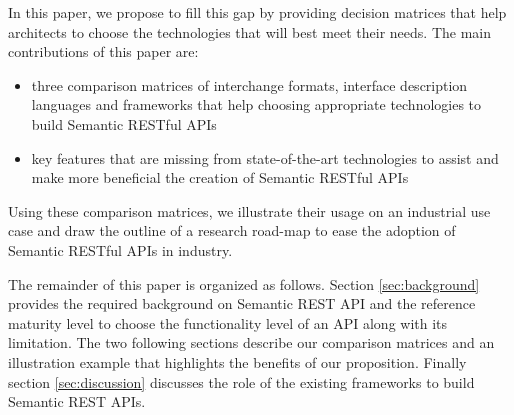  
 
In this paper, we propose to fill this gap by providing decision matrices that help architects to choose the technologies that will best meet their needs. The main contributions of this paper are:

\begin{itemize}
    \item three comparison matrices of interchange formats, interface description languages and frameworks that help choosing appropriate technologies to build Semantic RESTful APIs
    \item key features that are missing from state-of-the-art technologies to assist and make more beneficial the creation of Semantic RESTful APIs
\end{itemize}

Using these comparison matrices, we illustrate their usage on an industrial use case and draw the outline of a research road-map to ease the adoption of Semantic RESTful APIs in industry.

The remainder of this paper is organized as follows. Section \ref{sec:background} provides the required background on Semantic REST API and the reference maturity level to choose the functionality level of an API along with its limitation. The two following sections describe our comparison matrices and an illustration example that highlights the benefits of our proposition. Finally section \ref{sec:discussion} discusses the role of the existing frameworks to build Semantic REST APIs. 
